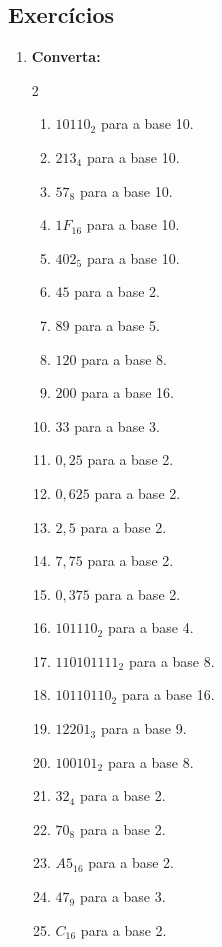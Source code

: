 \documentclass[12pt]{article}
\begin{document}
\subsection{Exercícios}
\begin{enumerate}
\item \textbf{Converta:}
\begin{multicols}{2}
    \begin{enumerate}
        \item $10110_2$ para a base 10.
        \item $213_4$ para a base 10.
        \item $57_8$ para a base 10.
        \item $1F_{16}$ para a base 10.
        \item $402_5$ para a base 10.
        \item $45$ para a base 2.
        \item $89$ para a base 5.
        \item $120$ para a base 8.
        \item $200$ para a base 16.
        \item $33$ para a base 3.
        \item $0,25$ para a base 2.
        \item $0,625$ para a base 2.
        \item $2,5$ para a base 2.
        \columnbreak
        \item $7,75$ para a base 2.
        \item $0,375$ para a base 2.
        \item $101110_2$ para a base 4.
        \item $110101111_2$ para a base 8.
        \item $10110110_2$ para a base 16.
        \item $12201_3$ para a base 9.
        \item $100101_2$ para a base 8.
        \item $32_4$ para a base 2.
        \item $70_8$ para a base 2.
        \item $A5_{16}$ para a base 2.
        \item $47_9$ para a base 3.
        \item $C_{16}$ para a base 2.
    \end{enumerate}
\end{multicols}
\end{enumerate}
\end{document}
